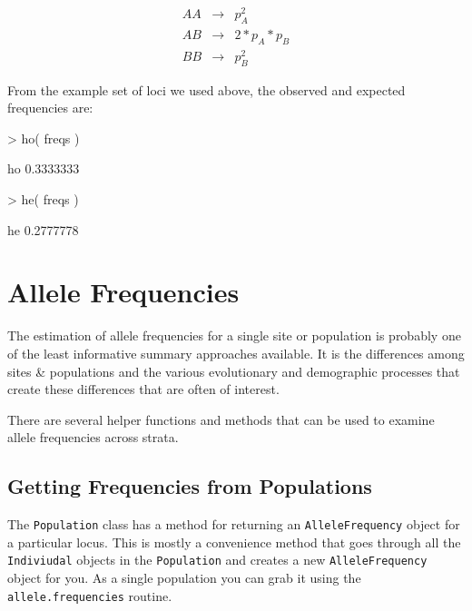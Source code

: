 \documentclass[letterpaper,twoside,openany]{book}
\begin{document}
\begin{eqnarray*}
	AA & \to &  p_A^2\\
	AB & \to & 2*p_A*p_B \\
	BB & \to &  p_B^2
\end{eqnarray*}

From the example set of loci we used above, the observed and expected frequencies are:

\begin{Schunk}
\begin{Sinput}
> ho( freqs )
\end{Sinput}
\begin{Soutput}
       ho 
0.3333333 
\end{Soutput}
\begin{Sinput}
> he( freqs )
\end{Sinput}
\begin{Soutput}
       he 
0.2777778 
\end{Soutput}
\end{Schunk}



\section{Allele Frequencies}


The estimation of allele frequencies for a single site or population is probably one of the least informative summary approaches available.  It is the differences among sites \& populations and the various evolutionary and demographic processes that create these differences that are often of interest.

There are several helper functions and methods that can be used to examine allele frequencies across strata.



\subsection{Getting Frequencies from Populations}

The \texttt{Population} class  has a method for returning an \texttt{AlleleFrequency} object for a particular locus.  This is mostly a convenience method that goes through all the \texttt{Indiviudal} objects in the \texttt{Population} and creates a new \texttt{AlleleFrequency} object for you.  As a single population you can grab it using the \texttt{allele.frequencies} routine.
\end{document}

